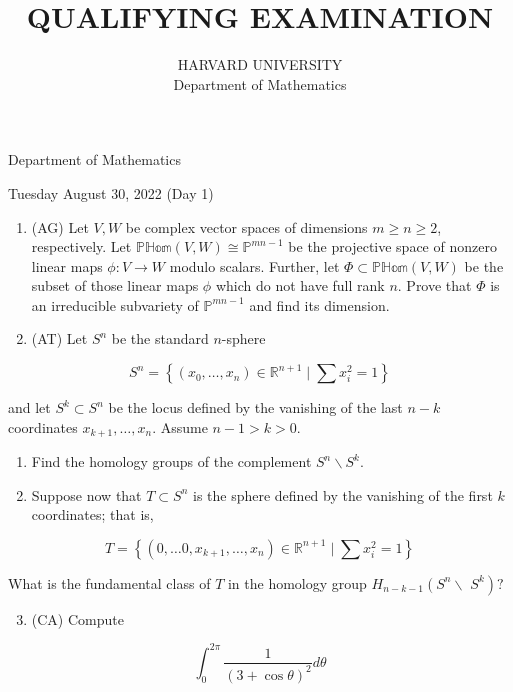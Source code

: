 \documentclass[10pt]{article}
\title{QUALIFYING EXAMINATION }
\author{HARVARD UNIVERSITY\\
Department of Mathematics}
\date{}
\begin{document}
\maketitle
Department of Mathematics

Tuesday August 30, 2022 (Day 1)

\begin{enumerate}
  \item (AG) Let $V, W$ be complex vector spaces of dimensions $m \geq n \geq 2$, respectively. Let $\mathbb{P H o m}(V, W) \cong \mathbb{P}^{m n-1}$ be the projective space of nonzero linear maps $\phi: V \rightarrow W$ modulo scalars. Further, let $\Phi \subset \mathbb{P H o m}(V, W)$ be the subset of those linear maps $\phi$ which do not have full rank $n$. Prove that $\Phi$ is an irreducible subvariety of $\mathbb{P}^{m n-1}$ and find its dimension.

  \item (AT) Let $S^{n}$ be the standard $n$-sphere

\end{enumerate}

$$
S^{n}=\left\{\left(x_{0}, \ldots, x_{n}\right) \in \mathbb{R}^{n+1} \mid \sum x_{i}^{2}=1\right\}
$$

and let $S^{k} \subset S^{n}$ be the locus defined by the vanishing of the last $n-k$ coordinates $x_{k+1}, \ldots, x_{n}$. Assume $n-1>k>0$.

\begin{enumerate}
  \item Find the homology groups of the complement $S^{n} \backslash S^{k}$.

  \item Suppose now that $T \subset S^{n}$ is the sphere defined by the vanishing of the first $k$ coordinates; that is,

\end{enumerate}

$$
T=\left\{\left(0, \ldots 0, x_{k+1}, \ldots, x_{n}\right) \in \mathbb{R}^{n+1} \mid \sum x_{i}^{2}=1\right\}
$$

What is the fundamental class of $T$ in the homology group $H_{n-k-1}\left(S^{n} \backslash\right.$ $\left.S^{k}\right) ?$

\begin{enumerate}
  \setcounter{enumi}{2}
  \item (CA) Compute
\end{enumerate}

$$
\int_{0}^{2 \pi} \frac{1}{(3+\cos \theta)^{2}} d \theta
$$
\end{document}
